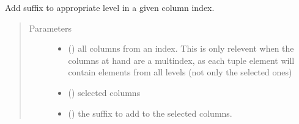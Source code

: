 \documentclass[letterpaper,10pt,english]{sphinxmanual}
\begin{document}
\begin{fulllineitems}
\label{\detokenize{dalio.util:dalio.util.level_utils.add_suffix}}
Add suffix to appropriate level in a given column index.
\begin{quote}\begin{description}
\item[{Parameters}] \leavevmode\begin{itemize}
\item {} 
 (\sphinxstyleliteralemphasis{\sphinxupquote{, }}) \textendash{} all columns from an index. This
is only relevent when the columns at hand are a multindex, as each
tuple element will contain elements from all levels (not only the
selected ones)

\item {} 
 (\sphinxstyleliteralemphasis{\sphinxupquote{, }}\sphinxstyleliteralemphasis{\sphinxupquote{, }}) \textendash{} selected columns

\item {} 
 () \textendash{} the suffix to add to the selected columns.

\end{itemize}

\end{description}\end{quote}

\end{fulllineitems}

\end{document}
